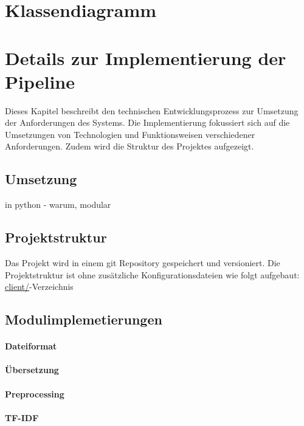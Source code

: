 \section{Klassendiagramm}
\newpage
\section{Details zur Implementierung der Pipeline}
Dieses Kapitel beschreibt den technischen Entwicklungsprozess zur Umsetzung der Anforderungen des Systems. Die Implementierung fokussiert sich auf die Umsetzungen von Technologien und Funktionsweisen verschiedener Anforderungen. Zudem wird die Struktur des Projektes aufgezeigt.
\subsection{Umsetzung}
in python - warum, modular
\subsection{Projektstruktur}
Das Projekt wird in einem git Repository gespeichert und versioniert. Die Projektstruktur ist ohne zusätzliche Konfigurationsdateien wie folgt aufgebaut:
\url{client/}-Verzeichnis

\subsection{Modulimplemetierungen}

\paragraph{Dateiformat}

\paragraph{Übersetzung}

\paragraph{Preprocessing}

\paragraph{TF-IDF}

